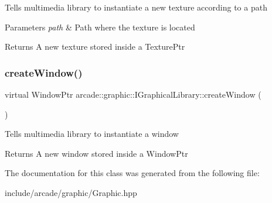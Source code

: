 Tells multimedia library to instantiate a new texture according to a path 
\begin{DoxyParams}{Parameters}
{\em path} & Path where the texture is located \\
\hline
\end{DoxyParams}
\begin{DoxyReturn}{Returns}
A new texture stored inside a Texture\+Ptr 
\end{DoxyReturn}
\mbox{\label{classarcade_1_1graphic_1_1_i_graphical_library_a98d401c1c0d6829857393e76a472f166}} 
\subsubsection{\texorpdfstring{createWindow()}{createWindow()}}
{\footnotesize\ttfamily virtual Window\+Ptr arcade\+::graphic\+::\+I\+Graphical\+Library\+::create\+Window (\begin{DoxyParamCaption}{ }\end{DoxyParamCaption})\hspace{0.3cm}{\ttfamily [pure virtual]}}

Tells multimedia library to instantiate a window \begin{DoxyReturn}{Returns}
A new window stored inside a Window\+Ptr 
\end{DoxyReturn}


The documentation for this class was generated from the following file\+:\begin{DoxyCompactItemize}
\item 
include/arcade/graphic/Graphic.\+hpp\end{DoxyCompactItemize}
